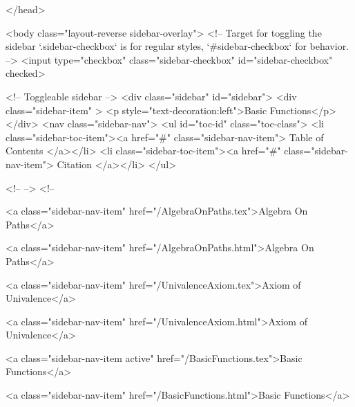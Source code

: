   
</head>




  <body class="layout-reverse sidebar-overlay">
    <!-- Target for toggling the sidebar `.sidebar-checkbox` is for regular
     styles, `#sidebar-checkbox` for behavior. -->
<input type="checkbox" class="sidebar-checkbox" id="sidebar-checkbox" checked>

<!-- Toggleable sidebar -->
<div class="sidebar" id="sidebar">
  <div class="sidebar-item" >
    <p style="text-decoration:left">Basic Functions</p>
  </div>
  <nav class="sidebar-nav">
    <ul id="toc-id" class="toc-class">
  <li class="sidebar-toc-item"><a href="#" class="sidebar-nav-item"> Table of Contents </a></li>
  <li class="sidebar-toc-item"><a href="#" class="sidebar-nav-item"> Citation </a></li>
</ul>


    <!--  -->
    <!-- 
      
    
      
    
      
    
      
        
      
    
      
        
          <a class="sidebar-nav-item" href="/AlgebraOnPaths.tex">Algebra On Paths</a>
        
      
    
      
        
          <a class="sidebar-nav-item" href="/AlgebraOnPaths.html">Algebra On Paths</a>
        
      
    
      
        
          <a class="sidebar-nav-item" href="/UnivalenceAxiom.tex">Axiom of Univalence</a>
        
      
    
      
        
          <a class="sidebar-nav-item" href="/UnivalenceAxiom.html">Axiom of Univalence</a>
        
      
    
      
        
          <a class="sidebar-nav-item active" href="/BasicFunctions.tex">Basic Functions</a>
        
      
    
      
        
          <a class="sidebar-nav-item" href="/BasicFunctions.html">Basic Functions</a>
        
      
    
